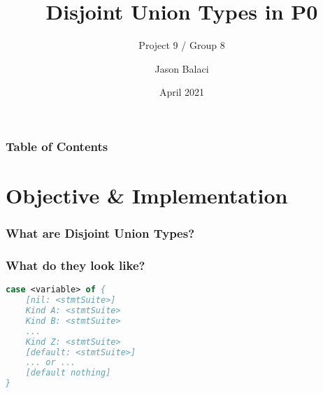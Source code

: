 \documentclass{beamer}
\title[Disjoint Union Types]{Disjoint Union Types in P0}
\subtitle{Project 9 / Group 8}
\author{Jason Balaci}
\institute{McMaster University}
\date{April 2021}
\begin{document}
\frame{\titlepage}

\begin{frame}
\frametitle{Table of Contents}
\tableofcontents
\end{frame}

\section{Objective \& Implementation}

\begin{frame}
\frametitle{What are Disjoint Union Types?}

\end{frame}

\begin{frame}
\frametitle{What do they look like?}
\end{frame}

\begin{lrbox}{\anatomyOfCaseBox}
\begin{lstlisting}[language=Pascal, basicstyle=\footnotesize]
case <variable> of {
    [nil: <stmtSuite>]
    Kind A: <stmtSuite>
    Kind B: <stmtSuite>
    ...
    Kind Z: <stmtSuite>
    [default: <stmtSuite>]
    ... or ...
    [default nothing]
}
\end{lstlisting}
\end{lrbox}
\end{document}
